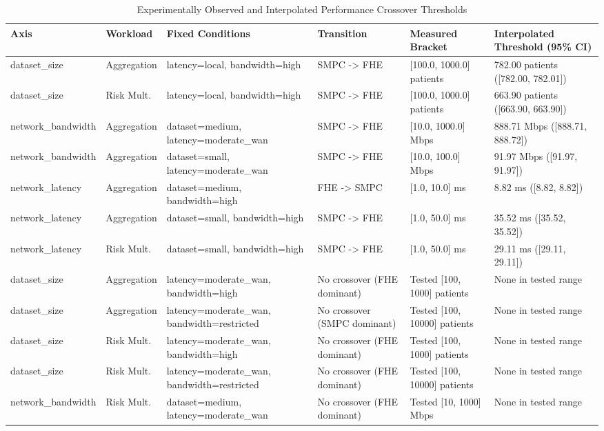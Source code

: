 \documentclass[conference]{IEEEtran}
\begin{document}
\begin{table}[htbp]
\caption{Experimentally Observed and Interpolated Performance Crossover Thresholds}
\label{tab:crossovers}
\centering
\scriptsize
\begin{tabular}{@{}llllll@{}}
\toprule
\textbf{Axis} & \textbf{Workload} & \textbf{Fixed Conditions} & \textbf{Transition} & \textbf{Measured Bracket} & \textbf{Interpolated Threshold (95\% CI)} \\
\midrule
dataset\_size & Aggregation & latency=local, bandwidth=high & SMPC -> FHE & [100.0, 1000.0] patients & 782.00 patients ([782.00, 782.01]) \\
dataset\_size & Risk Mult. & latency=local, bandwidth=high & SMPC -> FHE & [100.0, 1000.0] patients & 663.90 patients ([663.90, 663.90]) \\
network\_bandwidth & Aggregation & dataset=medium, latency=moderate\_wan & SMPC -> FHE & [10.0, 1000.0] Mbps & 888.71 Mbps ([888.71, 888.72]) \\
network\_bandwidth & Aggregation & dataset=small, latency=moderate\_wan & SMPC -> FHE & [10.0, 100.0] Mbps & 91.97 Mbps ([91.97, 91.97]) \\
network\_latency & Aggregation & dataset=medium, bandwidth=high & FHE -> SMPC & [1.0, 10.0] ms & 8.82 ms ([8.82, 8.82]) \\
network\_latency & Aggregation & dataset=small, bandwidth=high & SMPC -> FHE & [1.0, 50.0] ms & 35.52 ms ([35.52, 35.52]) \\
network\_latency & Risk Mult. & dataset=small, bandwidth=high & SMPC -> FHE & [1.0, 50.0] ms & 29.11 ms ([29.11, 29.11]) \\
dataset\_size & Aggregation & latency=moderate\_wan, bandwidth=high & No crossover (FHE dominant) & Tested [100, 1000] patients & None in tested range \\
dataset\_size & Aggregation & latency=moderate\_wan, bandwidth=restricted & No crossover (SMPC dominant) & Tested [100, 10000] patients & None in tested range \\
dataset\_size & Risk Mult. & latency=moderate\_wan, bandwidth=high & No crossover (FHE dominant) & Tested [100, 1000] patients & None in tested range \\
dataset\_size & Risk Mult. & latency=moderate\_wan, bandwidth=restricted & No crossover (FHE dominant) & Tested [100, 10000] patients & None in tested range \\
network\_bandwidth & Risk Mult. & dataset=medium, latency=moderate\_wan & No crossover (FHE dominant) & Tested [10, 1000] Mbps & None in tested range \\
\bottomrule
\end{tabular}
\end{table}
\end{document}
